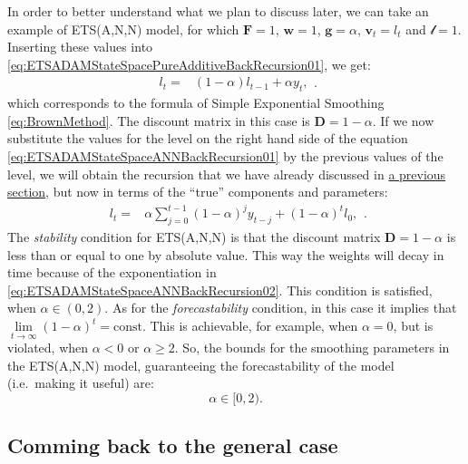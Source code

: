 \documentclass[
]{book}
\theoremstyle{definition}
\theoremstyle{definition}
\theoremstyle{definition}
\theoremstyle{definition}
\theoremstyle{remark}
\begin{document}
In order to better understand what we plan to discuss later, we can take an example of ETS(A,N,N) model, for which \(\mathbf{F}=1\), \(\mathbf{w}=1\), \(\mathbf{g}=\alpha\), \(\mathbf{v}_t=l_t\) and \(\boldsymbol{\mathscr{l}}=1\). Inserting these values into \eqref{eq:ETSADAMStateSpacePureAdditiveBackRecursion01}, we get:
\begin{equation}
  \begin{aligned}
    l_{t} = & \left(1 - \alpha \right) {l}_{t-1} + \alpha {y}_{t},
  \end{aligned}.
  \label{eq:ETSADAMStateSpaceANNBackRecursion01}
\end{equation}
which corresponds to the formula of Simple Exponential Smoothing \eqref{eq:BrownMethod}. The discount matrix in this case is \(\mathbf{D}=1-\alpha\). If we now substitute the values for the level on the right hand side of the equation \eqref{eq:ETSADAMStateSpaceANNBackRecursion01} by the previous values of the level, we will obtain the recursion that we have already discussed in \protect\hyperlink{whyExponential}{a previous section}, but now in terms of the ``true'' components and parameters:
\begin{equation}
  \begin{aligned}
    l_{t} = & {\alpha} \sum_{j=0}^{t-1} (1 -{\alpha})^j {y}_{t-j} + (1 -{\alpha})^t l_0,
  \end{aligned}.
  \label{eq:ETSADAMStateSpaceANNBackRecursion02}
\end{equation}
The \emph{stability} condition for ETS(A,N,N) is that the discount matrix \(\mathbf{D}=1-\alpha\) is less than or equal to one by absolute value. This way the weights will decay in time because of the exponentiation in \eqref{eq:ETSADAMStateSpaceANNBackRecursion02}. This condition is satisfied, when \(\alpha \in(0, 2)\). As for the \emph{forecastability} condition, in this case it implies that \(\lim\limits_{t\rightarrow\infty}(1 -{\alpha})^t = \text{const}\). This is achievable, for example, when \(\alpha=0\), but is violated, when \(\alpha<0\) or \(\alpha\geq 2\). So, the bounds for the smoothing parameters in the ETS(A,N,N) model, guaranteeing the forecastability of the model (i.e.~making it useful) are:
\begin{equation}
  \alpha \in [0, 2) .
  \label{eq:ETSADAMStateSpaceANNBounds}
\end{equation}

\hypertarget{comming-back-to-the-general-case}{%
\subsection{Comming back to the general case}\label{comming-back-to-the-general-case}}
\end{document}
